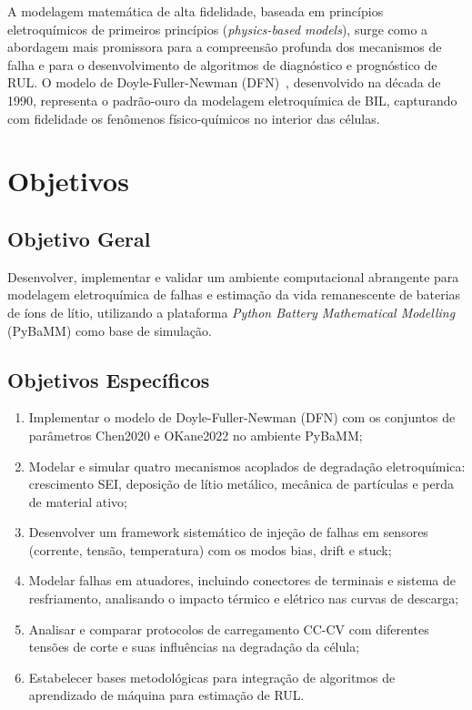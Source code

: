 \documentclass[
    12pt,
    openright,
    twoside,
    a4paper,
    brazil,
    english
]{abntex2}
\begin{document}
A modelagem matemática de alta fidelidade, baseada em princípios eletroquímicos
de primeiros princípios (\textit{physics-based models}), surge como a abordagem
mais promissora para a compreensão profunda dos mecanismos de falha e para o
desenvolvimento de algoritmos de diagnóstico e prognóstico de RUL. O modelo de
Doyle-Fuller-Newman (DFN)~\cite{doyle1993modeling}, desenvolvido na década de
1990, representa o padrão-ouro da modelagem eletroquímica de BIL, capturando com
fidelidade os fenômenos físico-químicos no interior das células.

\section{Objetivos}

\subsection{Objetivo Geral}

Desenvolver, implementar e validar um ambiente computacional abrangente para
modelagem eletroquímica de falhas e estimação da vida remanescente de baterias
de íons de lítio, utilizando a plataforma \textit{Python Battery Mathematical
Modelling} (PyBaMM) como base de simulação.

\subsection{Objetivos Específicos}

\begin{enumerate}
  \item Implementar o modelo de Doyle-Fuller-Newman (DFN) com os conjuntos de
        parâmetros Chen2020 e OKane2022 no ambiente PyBaMM;
  \item Modelar e simular quatro mecanismos acoplados de degradação eletroquímica:
        crescimento SEI, deposição de lítio metálico, mecânica de partículas e
        perda de material ativo;
  \item Desenvolver um framework sistemático de injeção de falhas em sensores
        (corrente, tensão, temperatura) com os modos bias, drift e stuck;
  \item Modelar falhas em atuadores, incluindo conectores de terminais e sistema
        de resfriamento, analisando o impacto térmico e elétrico nas curvas de
        descarga;
  \item Analisar e comparar protocolos de carregamento CC-CV com diferentes
        tensões de corte e suas influências na degradação da célula;
  \item Estabelecer bases metodológicas para integração de algoritmos de
        aprendizado de máquina para estimação de RUL.
\end{enumerate}
\end{document}
